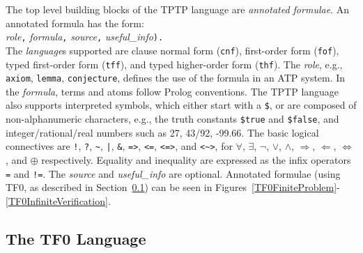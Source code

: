 \documentclass[letterpaper]{article}
\newcommand{\smalltt}[1]{\small \texttt{#1}}
\begin{document}
The top level building blocks of the TPTP language are {\em annotated
formulae}.
An annotated formula has the form:\\
{\em role}{\tt ,}
{\em formula}{\tt ,}
{\em source}{\tt ,}
{\em useful\_info}{\tt ).}\\
The {\em language}s supported are clause normal form (\smalltt{cnf}), first-order form 
(\smalltt{fof}), typed first-order form (\smalltt{tff}), and typed higher-order form 
(\smalltt{thf}).
The {\em role}, e.g., \smalltt{axiom}, \smalltt{lemma}, \smalltt{conjecture},
defines the use of the formula in an ATP system.
In the {\em formula}, terms and atoms follow Prolog conventions.
The TPTP language also supports interpreted symbols, which either start with a
{\tt \$}, or are composed of non-alphanumeric characters, e.g., the truth
constants \smalltt{\$true} and \smalltt{\$false}, and integer/rational/real
numbers such as 27, 43/92, -99.66.
The basic logical connectives are
{\tt !}, {\tt ?}, {\tt \verb|~|}, {\tt |}, {\tt \&}, {\tt =>}, {\tt <=},
{\tt <=>}, and {\tt <\verb|~|>},
for
$\forall$, $\exists$, $\neg$, $\vee$, $\wedge$, $\Rightarrow$, $\Leftarrow$,
$\Leftrightarrow$, and $\oplus$ respectively.
Equality and inequality are expressed as the infix operators {\tt =} and
{\tt !=}.
The {\em source} and {\em useful\_info} are optional.
Annotated formulae (using TF0, as described in Section~\ref{TF0}) can be seen in 
Figures~\ref{TF0FiniteProblem}-\ref{TF0InfiniteVerification}.

\subsection{The TF0 Language}
\label{TF0}
\end{document}
